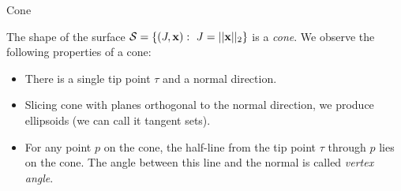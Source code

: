 \documentclass{beamer}
\begin{document}
\begin{frame}{Cone}
	\begin{flushleft}
		
		The shape of the surface $\mathcal S = \{  (J, \mathbf{x}): \ J = || \mathbf{x} ||_2 \}$ is a \emph{cone}. We observe the following properties of a cone:
		
		\begin{itemize}
			\item There is a single tip point $\tau$ and a normal direction.
			
			\item  Slicing cone with planes orthogonal to the normal direction, we produce ellipsoids (we can call it tangent sets).
			
			\item For any point $p$ on the cone, the half-line from the tip point $\tau$ through $p$ lies on the cone. The angle between this line and the normal is called \emph{vertex angle}.
		\end{itemize}
		
		
		
		
		
	\end{flushleft}
\end{frame}
\end{document}
